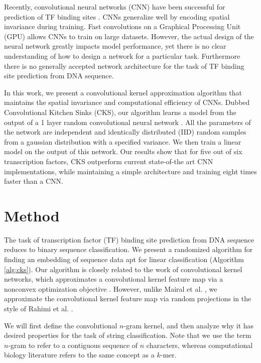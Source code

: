 \documentclass{article}
\begin{document}
Recently, convolutional neural networks (CNN) have been successful for prediction of
TF binding sites \cite{zhou2015predicting,  alipanahi2015predicting, kelley2016basset}.
CNNs generalize well by encoding spatial invariance during training.
Fast convolutions on a Graphical Processing Unit (GPU) allows CNNs to train on large datasets.
However, the actual design of the neural network greatly impacts model performance,
yet there is no clear understanding of how to design a network for a particular task.
Furthermore there is no generally accepted network architecture for the task of TF binding
site prediction from DNA sequence.

In this work, we present a convolutional kernel approximation algorithm that maintains the spatial invariance
and computational efficiency of CNNs.
Dubbed Convolutional Kitchen Sinks (CKS), our algorithm learns a model from the output of a
1 layer random convolutional neural network \cite{rahimi2009weighted}. All the parameters of the network are independent and identically distributed (IID)
random samples from a gaussian distribution with a specified variance.
We then train a linear model on the output of this network.
Our results show that for five out of six transcription factors, CKS outperform
current state-of-the art CNN implementations, while maintaining a simple architecture and training eight times faster than a CNN.


\section{Method}
The task of transcription factor (TF) binding site prediction from DNA sequence reduces to binary sequence classification.
We present a randomized algorithm for finding an embedding of sequence data apt for linear classification (Algorithm \ref{alg:cks}). Our algorithm is closely related to the work of convolutional kernel networks, which approximates a convolutional kernel feature map via a nonconvex optimization objective \cite{mairal2014convolutional}. However, unlike Mairal et al. \cite{mairal2014convolutional},
we approximate the convolutional kernel feature map via random projections in the style of  Rahimi et al. \cite{rahimi2009weighted, rahimi2007random}.

We will first define the convolutional $n$-gram kernel, and then analyze why it has
desired properties for the task of string classification.
Note that we use the term $n$-gram to refer to a contiguous sequence of $n$ characters,
whereas computational biology literature refers to the same concept as a $k$-mer.
\end{document}
